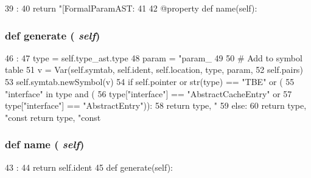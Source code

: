\begin{DoxyCode}
39                       :
40         return "[FormalParamAST: %
41 
42     @property
    def name(self):
\end{DoxyCode}
\hypertarget{classslicc_1_1ast_1_1FormalParamAST_1_1FormalParamAST_a4555d1cee0dccf3942ea35fe86de2e8e}{
\subsubsection[{generate}]{\setlength{\rightskip}{0pt plus 5cm}def generate ( {\em self})}}
\label{classslicc_1_1ast_1_1FormalParamAST_1_1FormalParamAST_a4555d1cee0dccf3942ea35fe86de2e8e}



\begin{DoxyCode}
46                       :
47         type = self.type_ast.type
48         param = "param_%
49 
50         # Add to symbol table
51         v = Var(self.symtab, self.ident, self.location, type, param,
52                 self.pairs)
53         self.symtab.newSymbol(v)
54         if self.pointer or str(type) == "TBE" or (
55            "interface" in type and (
56                type["interface"] == "AbstractCacheEntry" or
57                type["interface"] == "AbstractEntry")):
58             return type, "%
59         else:
60             return type, "const %
            return type, "const %
\end{DoxyCode}
\hypertarget{classslicc_1_1ast_1_1FormalParamAST_1_1FormalParamAST_a757840459670ee7692e00cf5ddc722d5}{
\subsubsection[{name}]{\setlength{\rightskip}{0pt plus 5cm}def name ( {\em self})}}
\label{classslicc_1_1ast_1_1FormalParamAST_1_1FormalParamAST_a757840459670ee7692e00cf5ddc722d5}



\begin{DoxyCode}
43                   :
44         return self.ident
45 
    def generate(self):
\end{DoxyCode}


